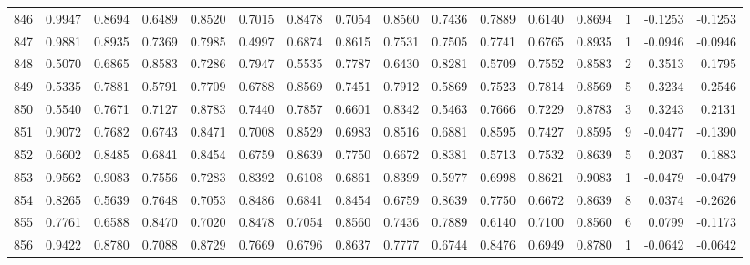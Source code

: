 \begin{tabular}{lrrrrrrrrrrrrrrr}
846 &      0.9947 &  0.8694 &  0.6489 &  0.8520 &  0.7015 &  0.8478 &  0.7054 &  0.8560 &  0.7436 &  0.7889 &   0.6140 &     0.8694 &      1 &                   -0.1253 &                    -0.1253 \\
847 &      0.9881 &  0.8935 &  0.7369 &  0.7985 &  0.4997 &  0.6874 &  0.8615 &  0.7531 &  0.7505 &  0.7741 &   0.6765 &     0.8935 &      1 &                   -0.0946 &                    -0.0946 \\
848 &      0.5070 &  0.6865 &  0.8583 &  0.7286 &  0.7947 &  0.5535 &  0.7787 &  0.6430 &  0.8281 &  0.5709 &   0.7552 &     0.8583 &      2 &                    0.3513 &                     0.1795 \\
849 &      0.5335 &  0.7881 &  0.5791 &  0.7709 &  0.6788 &  0.8569 &  0.7451 &  0.7912 &  0.5869 &  0.7523 &   0.7814 &     0.8569 &      5 &                    0.3234 &                     0.2546 \\
850 &      0.5540 &  0.7671 &  0.7127 &  0.8783 &  0.7440 &  0.7857 &  0.6601 &  0.8342 &  0.5463 &  0.7666 &   0.7229 &     0.8783 &      3 &                    0.3243 &                     0.2131 \\
851 &      0.9072 &  0.7682 &  0.6743 &  0.8471 &  0.7008 &  0.8529 &  0.6983 &  0.8516 &  0.6881 &  0.8595 &   0.7427 &     0.8595 &      9 &                   -0.0477 &                    -0.1390 \\
852 &      0.6602 &  0.8485 &  0.6841 &  0.8454 &  0.6759 &  0.8639 &  0.7750 &  0.6672 &  0.8381 &  0.5713 &   0.7532 &     0.8639 &      5 &                    0.2037 &                     0.1883 \\
853 &      0.9562 &  0.9083 &  0.7556 &  0.7283 &  0.8392 &  0.6108 &  0.6861 &  0.8399 &  0.5977 &  0.6998 &   0.8621 &     0.9083 &      1 &                   -0.0479 &                    -0.0479 \\
854 &      0.8265 &  0.5639 &  0.7648 &  0.7053 &  0.8486 &  0.6841 &  0.8454 &  0.6759 &  0.8639 &  0.7750 &   0.6672 &     0.8639 &      8 &                    0.0374 &                    -0.2626 \\
855 &      0.7761 &  0.6588 &  0.8470 &  0.7020 &  0.8478 &  0.7054 &  0.8560 &  0.7436 &  0.7889 &  0.6140 &   0.7100 &     0.8560 &      6 &                    0.0799 &                    -0.1173 \\
856 &      0.9422 &  0.8780 &  0.7088 &  0.8729 &  0.7669 &  0.6796 &  0.8637 &  0.7777 &  0.6744 &  0.8476 &   0.6949 &     0.8780 &      1 &                   -0.0642 &                    -0.0642 \\

\end{tabular}
